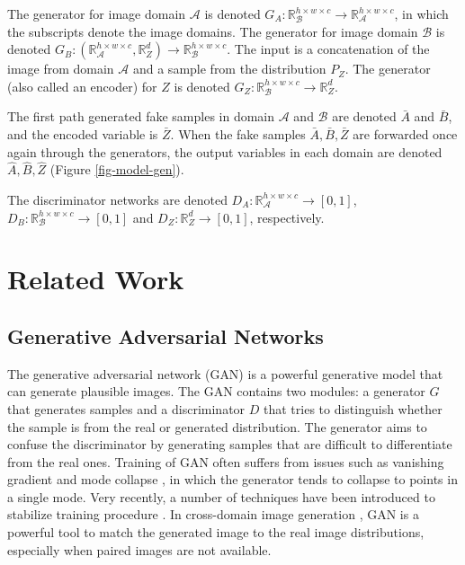 \documentclass[conference]{IEEEtran}
\theoremstyle{definition}
\begin{document}
The generator for image domain $\mathcal A$ is denoted $G_{A}: \mathbb R_{\mathcal B}^{h\times w\times c}\rightarrow \mathbb R_{\mathcal A}^{h\times w\times
c}$, in which the subscripts denote the image domains. The generator for image domain $\mathcal B$ is denoted $G_{B}: (\mathbb R_{\mathcal A}^{h\times w\times c}, \mathbb R_{Z}^{d})\rightarrow \mathbb R_{\mathcal B}^{h\times w\times c}$. The input is a concatenation of the image from domain
$\mathcal A$ and  a sample from the distribution $P_{Z}$. The generator (also called an encoder) for $Z$ is denoted $G_Z: \mathbb R_{\mathcal B}^{h\times w\times c}\rightarrow \mathbb R_{Z}^{d}$. 

The first path generated fake samples in domain $\mathcal A$ and $\mathcal B$ are denoted $\bar{A}$ and $\bar{B}$, and the encoded variable is $\bar{Z}$. When 
the fake samples $\bar{A}, \bar{B}, \bar{Z}$ 
are forwarded
once again through the generators, 
the output variables in each domain 
are denoted
$\hat{A}, \hat{B}, \hat{Z}$ (Figure \ref{fig-model-gen}).

The discriminator networks are denoted $D_A: \mathbb R_{\mathcal A}^{h\times w\times c}\rightarrow [0, 1]$, $D_B: \mathbb R_{\mathcal B}^{h\times
w\times c}\rightarrow [0, 1]$ and $D_Z: \mathbb R_{Z}^{d}\rightarrow [0, 1]$, respectively.

\section{Related Work}
\label{sec-related}

\subsection{Generative Adversarial Networks}

The generative adversarial network (GAN) \cite{goodfellow2014generative} is a powerful generative model that can generate plausible images. The
GAN contains two modules: a generator $G$ that generates samples and a discriminator $D$ that tries to distinguish whether the sample is from the
real or generated distribution. The generator aims to confuse the discriminator by generating samples that are difficult to differentiate from
the real ones. Training of GAN often suffers from issues such as vanishing gradient and mode collapse \cite{salimans2016improved}, in which the
generator tends to collapse to points in a single mode. Very recently, a number of techniques have been introduced to stabilize training
procedure \cite{gulrajani2017improved, salimans2016improved}. In cross-domain image generation \cite{isola2016image, kim2017learning,
zhu2017unpaired, liu2017unsupervised}, GAN is a powerful tool to match the generated image to the real image distributions, especially when
paired images are not available. 
\end{document}
